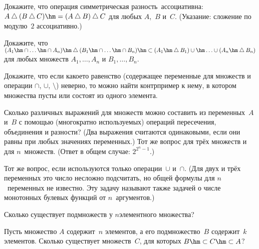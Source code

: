 \begin{problem}
Докажите, что операция  симметрическая разность\ ассоциативна:
${A\bigtriangleup(B\bigtriangleup C)}\hm=
{(A\bigtriangleup B)\bigtriangleup C}$
для любых $A$,~$B$ и~$C$. (Указание: сложение по модулю~$2$
ассоциативно.)
\end{problem}

\begin{problem}
Докажите, что $(A_1\hm\cap\ldots\hm\cap A_n)\hm\bigtriangleup
(B_1\hm\cap\ldots\hm\cap B_n)\hm\subset (A_1\hm\bigtriangleup
B_1)\cup\hm\ldots\cup(A_n\hm\bigtriangleup B_n)$ для любых
множеств $A_1,\dots,A_n$ и $B_1,\dots,B_n$.
\end{problem}

\begin{problem}
Докажите, что если какое\д то равенство (содержащее переменные для
множеств и операции $\cap$, $\cup$, $\setminus$) неверно, то можно
найти контрпример к нему, в котором множества пусты или состоят
из одного элемента.
\end{problem}

\begin{problem}
Сколько различных выражений для множеств можно составить из
переменных~$A$ и~$B$ с помощью (многократно используемых)
операций пересечения, объединения и разности? (Два выражения
считаются одинаковыми, если они равны при любых значениях
переменных.) Тот же вопрос для трёх множеств и для $n$~множеств.
(Ответ в общем случае: $2^{2^n-1}$.)
\end{problem}

\begin{problem}
Тот же вопрос, если используются только операции~$\cup$ и~$\cap$.
(Для двух и трёх переменных это число несложно подсчитать,
но общей формулы для $n$~переменных не известно.  Эту
задачу называют также задачей о
числе монотонных булевых функций
от $n$~аргументов.)
\end{problem}

\begin{problem}
Сколько существует подмножеств у $n$\д элементного множества?
\end{problem}

\begin{problem}
Пусть множество $A$ содержит~$n$ элементов, а его
подмножество~$B$ содержит~$k$ элементов. Сколько существует
множеств~$C$, для которых $B\hm\subset C\hm\subset A$?
\end{problem}

